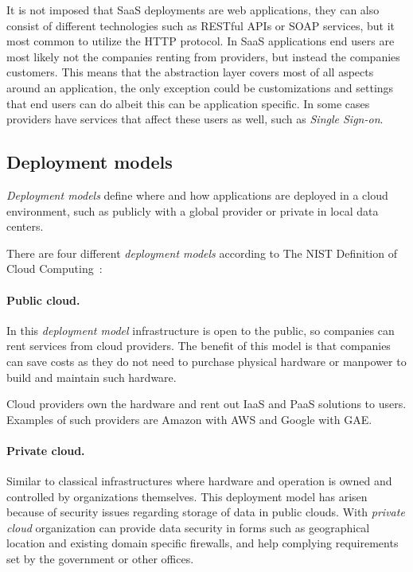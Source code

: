 It is not imposed that SaaS deployments are web applications, they can also consist of
different technologies such as RESTful APIs or SOAP services, but it most common to utilize the HTTP protocol.
In SaaS applications end users are most likely not the companies renting from providers, 
but instead the companies customers.
This means that the abstraction layer covers most of all aspects around an application,
the only exception could be customizations and settings that end users can do albeit 
this can be application specific. In some cases providers have services that affect
these users as well, such as \emph{Single Sign-on}.

\subsection{Deployment models}

\emph{Deployment models} define where and how applications are deployed in a cloud environment,
such as publicly with a global provider or private in local data centers.

There are four different \emph{deployment models} according to The 
NIST Definition of Cloud Computing~\cite{nist:mell11}:

\paragraph{Public cloud.}

In this \emph{deployment model} infrastructure is open to the public,
so companies can rent services from cloud providers.
The benefit of this model is that companies can save costs as 
they do not need to purchase physical hardware or manpower to build and maintain such hardware.

Cloud providers own the hardware and rent out IaaS and PaaS solutions to users.
Examples of such providers are Amazon with AWS and Google with GAE.

\paragraph{Private cloud.}

Similar to classical infrastructures where hardware and
operation is owned and controlled by organizations themselves.
This deployment model has arisen because of security issues regarding storage 
of data in public clouds. With \emph{private cloud} organization can provide 
data security in forms such as geographical location and existing domain specific firewalls,
and help complying requirements set by the government or other offices.

